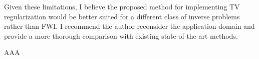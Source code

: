 \begin{point}
	Given these limitations, I believe the proposed method for implementing TV regularization would be better suited for a different class of inverse problems rather than FWI. I recommend the author reconsider the application domain and provide a more thorough comparison with existing state-of-the-art methods.
\end{point}

\begin{reply}
	AAA
	
\end{reply}

